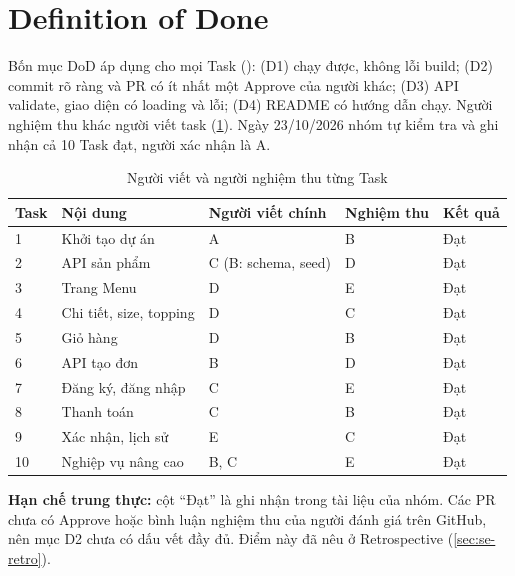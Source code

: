 \section{Definition of Done}\label{sec:se-dod}
Bốn mục DoD áp dụng cho mọi Task (): (D1) chạy được, không lỗi build; (D2) commit rõ ràng và PR có ít nhất một Approve của người khác; (D3) API validate, giao diện có loading và lỗi; (D4) README có hướng dẫn chạy. Người nghiệm thu khác người viết task (\cref{tab:nghiemthu}). Ngày 23/10/2026 nhóm tự kiểm tra và ghi nhận cả 10 Task đạt, người xác nhận là A.
\begin{table}[htbp]\centering
\caption{Người viết và người nghiệm thu từng Task}\label{tab:nghiemthu}
\begin{tabular}{@{}p{1cm}p{4.4cm}p{3.6cm}p{2.6cm}p{1.2cm}@{}}\toprule
\textbf{Task} & \textbf{Nội dung} & \textbf{Người viết chính} & \textbf{Nghiệm thu} & \textbf{Kết quả} \\ \midrule
1 & Khởi tạo dự án & A & B & Đạt \\
2 & API sản phẩm & C (B: schema, seed) & D & Đạt \\
3 & Trang Menu & D & E & Đạt \\
4 & Chi tiết, size, topping & D & C & Đạt \\
5 & Giỏ hàng & D & B & Đạt \\
6 & API tạo đơn & B & D & Đạt \\
7 & Đăng ký, đăng nhập & C & E & Đạt \\
8 & Thanh toán & C & B & Đạt \\
9 & Xác nhận, lịch sử & E & C & Đạt \\
10 & Nghiệp vụ nâng cao & B, C & E & Đạt \\ \bottomrule
\end{tabular}
\end{table}
\textbf{Hạn chế trung thực:} cột ``Đạt'' là ghi nhận trong tài liệu của nhóm. Các PR chưa có Approve hoặc bình luận nghiệm thu của người đánh giá trên GitHub, nên mục D2 chưa có dấu vết đầy đủ. Điểm này đã nêu ở Retrospective (\cref{sec:se-retro}).
